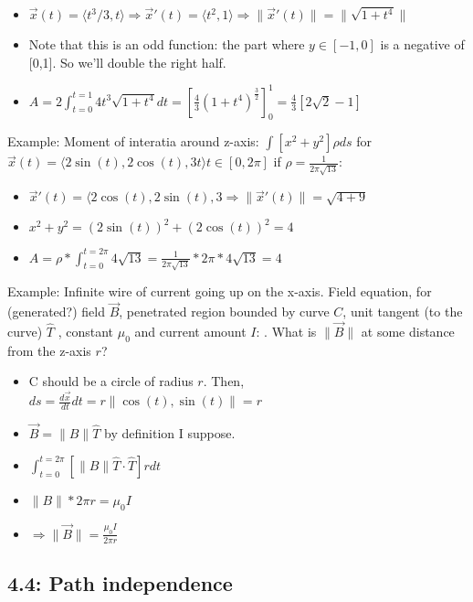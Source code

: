 \documentclass[11pt, oneside]{article}   	%
\begin{document}
\begin{itemize}
\item $\vec{x}(t) = \langle t^3 / 3, t \rangle \Rightarrow \vec{x}'(t)  = \langle t^2, 1 \rangle \Rightarrow \| \vec{x}'(t)  \| = \| \sqrt{1 + t^4} \|$
\item Note that this is an odd function: the part where $y \in [-1, 0]$ is a negative of [0,1].  So we'll double the right half.
\item $A = 2 \int_{t=0}^{t=1} 4t^3 \sqrt{1+t^4}dt =[\frac{4}{3}(1+t^4)^\frac{3}{2}]_0^1 = \frac{4}{3}[2\sqrt{2}- 1]$
\end{itemize}

Example: Moment of interatia around z-axis: $\int[x^2+y^2]\rho ds$ for $\vec{x}(t)=\langle 2\sin(t), 2\cos(t), 3t\rangle t \in [0,2\pi]$ if $\rho = \frac{1}{2\pi\sqrt{13}}$:
\begin{itemize}
\item $\vec{x}'(t) = \langle 2\cos(t), 2\sin(t), 3 \Rightarrow \| \vec{x}'(t)  \| = \sqrt{4 + 9}$
\item $x^2 + y^2 = (2\sin(t))^2 + (2\cos(t))^2 = 4$
\item $A = \rho * \int_{t=0}^{t=2\pi} 4 \sqrt{13} =  \frac{1}{2\pi\sqrt{13}} * 2\pi * 4\sqrt{13} = 4$
\end{itemize}

Example: Infinite wire of current going up on the x-axis.  Field equation, for (generated?) field $\vec{B}$, penetrated region bounded by curve $C$, unit tangent (to the curve) $\hat{T}$ , constant $\mu_0$ and current amount $I$: .  What is $\| \vec{B} \|$ at some distance from the z-axis $r$?
\begin{itemize} 
\item C should be a circle of radius $r$.  Then, $ds = \frac{d\vec{x}}{dt}dt = r \| \cos(t), \sin(t) \| = r$
\item $\vec{B} = \|B\| \hat{T}$ by definition I suppose.
\item $\int_{t = 0}^{t=2\pi} [ \|B\| \hat{T} \cdot \hat{T}] r dt$
\item $\|B\| * 2\pi r = \mu_0 I$
\item $\Rightarrow \|\vec{B}\| = \frac{\mu_0 I}{ 2\pi r }$

\end{itemize} 

\subsection{4.4: Path independence}
\end{document}
